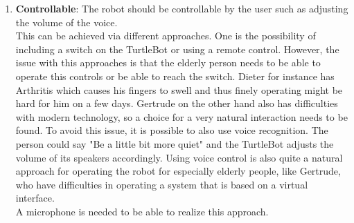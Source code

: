 \documentclass[plainarticle,zihtitle,english,final,hyperref,utf8]{zihpub}
\begin{document}
\begin{enumerate}
    \item \textbf{Controllable}: The robot should be controllable by the user such as adjusting the volume of the voice.\\
    \newline
    This can be achieved via different approaches. One is the possibility of including a switch on the TurtleBot or using a remote control. However, the issue with this approaches is that the elderly person needs to be able to operate this controls or be able to reach the switch. Dieter for instance has Arthritis which causes his fingers to swell and thus finely operating might be hard for him on a few days. Gertrude on the other hand also has difficulties with modern technology, so a choice for a very natural interaction needs to be found.
    To avoid this issue, it is possible to also use voice recognition. The person could say "Be a little bit more quiet" and the TurtleBot adjusts the volume of its speakers accordingly. Using voice control is also quite a natural approach for operating the robot for especially elderly people, like Gertrude, who have difficulties in operating a system that is based on a virtual interface.\\
    A microphone is needed to be able to realize this approach.
\end{enumerate}
\end{document}

